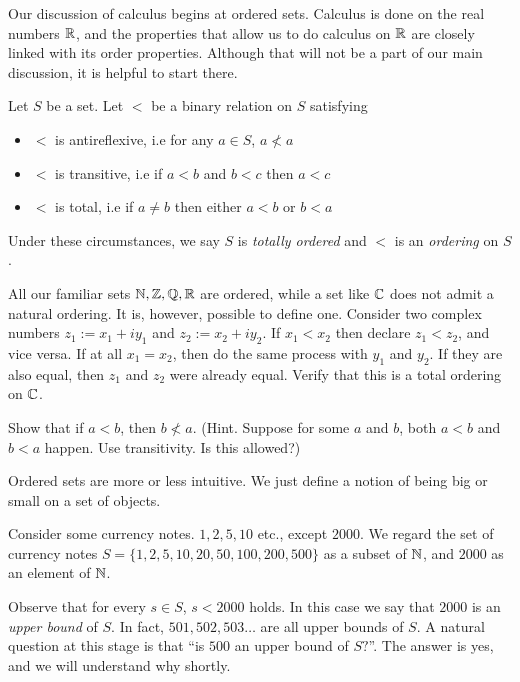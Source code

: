 

Our discussion of calculus begins at ordered sets. Calculus is done on the real numbers $\mathbb{R}$, and the properties that allow us to do calculus on $\mathbb{R}$ are closely linked with its order properties. Although that will not be a part of our main discussion, it is helpful to start there.
\begin{SNP}{\dfn}{Let $S$ be a set. Let $<$ be a binary relation on $S$ satisfying
\begin{itemize}
	\item $<$ is antireflexive, i.e for any $a \in S$, $a \not < a$
	\item $<$ is transitive, i.e if $a < b$ and $b < c$ then $a < c$
	\item $<$ is total, i.e if $a \neq b$ then either $a < b$ or $b < a$
\end{itemize}
Under these circumstances, we say $S$ is \emph{totally ordered} and $<$ is an \emph{ordering} on $S$.}
\end{SNP}

All our familiar sets $\mathbb{N}, \mathbb{Z}, \mathbb{Q}, \mathbb{R}$ are ordered, while a set like $\mathbb{C}$ does not admit a natural ordering. It is, however, possible to define one. Consider two complex numbers $z_1 := x_1 + iy_1$ and $z_2 := x_2 + iy_2$. If $x_1 < x_2$ then declare $z_1 < z_2$, and vice versa. If at all $x_1 = x_2$, then do the same process with $y_1$ and $y_2$. If they are also equal, then $z_1$ and $z_2$ were already equal. Verify that this is a total ordering on $\mathbb{C}$.
\begin{SNP}{\ex}{Show that if $a < b$, then $b \not < a$. (Hint. Suppose for some $a$ and $b$, both $a < b$ and $b < a$ happen. Use transitivity. Is this allowed?)}
\end{SNP}
Ordered sets are more or less intuitive. We just define a notion of being big or small on a set of objects.

Consider some currency notes. $1, 2, 5, 10$ etc., except $2000$. We regard the set of currency notes $S = \{1, 2, 5, 10, 20, 50, 100, 200, 500\}$ as a subset of $\mathbb{N}$, and $2000$ as an element of $\mathbb{N}$.

Observe that for every $s \in S$, $s < 2000$ holds. In this case we say that $2000$ is an \emph{upper bound} of $S$. In fact, $501, 502, 503 \dots$ are all upper bounds of $S$. A natural question at this stage is that ``is $500$ an upper bound of $S?$''. The answer is yes, and we will understand why shortly.

